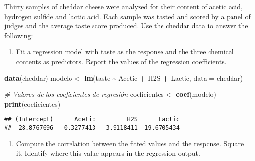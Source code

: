 \documentclass[
]{article}
\newenvironment{Shaded}{\begin{snugshade}}{\end{snugshade}}
\newcommand{\AttributeTok}[1]{\textcolor[rgb]{0.13,0.29,0.53}{#1}}
\newcommand{\CommentTok}[1]{\textcolor[rgb]{0.56,0.35,0.01}{\textit{#1}}}
\newcommand{\DecValTok}[1]{\textcolor[rgb]{0.00,0.00,0.81}{#1}}
\newcommand{\FunctionTok}[1]{\textcolor[rgb]{0.13,0.29,0.53}{\textbf{#1}}}
\newcommand{\NormalTok}[1]{#1}
\newcommand{\OtherTok}[1]{\textcolor[rgb]{0.56,0.35,0.01}{#1}}
\newcommand{\SpecialCharTok}[1]{\textcolor[rgb]{0.81,0.36,0.00}{\textbf{#1}}}
\providecommand{\tightlist}{%
  \setlength{\itemsep}{0pt}\setlength{\parskip}{0pt}}
\begin{document}
Thirty samples of cheddar cheese were analyzed for their content of
acetic acid, hydrogen sulfide and lactic acid. Each sample was tasted
and scored by a panel of judges and the average taste score produced.
Use the cheddar data to answer the following:

\begin{enumerate}
\def\labelenumi{(\alph{enumi})}
\tightlist
\item
  Fit a regression model with taste as the response and the three
  chemical contents as predictors. Report the values of the regression
  coefficients.
\end{enumerate}

\begin{Shaded}
\begin{Highlighting}[]
\FunctionTok{data}\NormalTok{(cheddar)}
\NormalTok{modelo }\OtherTok{\textless{}{-}} \FunctionTok{lm}\NormalTok{(taste }\SpecialCharTok{\textasciitilde{}}\NormalTok{ Acetic }\SpecialCharTok{+}\NormalTok{ H2S }\SpecialCharTok{+}\NormalTok{ Lactic, }\AttributeTok{data =}\NormalTok{ cheddar)}

\CommentTok{\# Valores de los coeficientes de regresión}
\NormalTok{coeficientes }\OtherTok{\textless{}{-}} \FunctionTok{coef}\NormalTok{(modelo)}
\FunctionTok{print}\NormalTok{(coeficientes)}
\end{Highlighting}
\end{Shaded}

\begin{verbatim}
## (Intercept)      Acetic         H2S      Lactic 
## -28.8767696   0.3277413   3.9118411  19.6705434
\end{verbatim}

\begin{enumerate}
\def\labelenumi{(\alph{enumi})}
\setcounter{enumi}{1}
\tightlist
\item
  Compute the correlation between the fitted values and the response.
  Square it. Identify where this value appears in the regression output.
\end{enumerate}

\begin{Shaded}
\end{Shaded}
\end{document}
